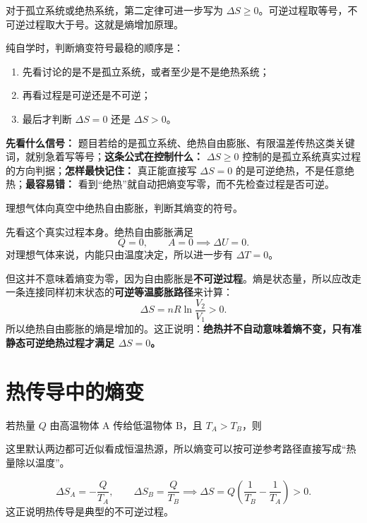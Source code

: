 \documentclass[lang=cn,11pt]{elegantbook}
\begin{document}
对于孤立系统或绝热系统，第二定律可进一步写为 \(\Delta S\ge 0\)。可逆过程取等号，不可逆过程取大于号。这就是熵增加原理。

纯自学时，判断熵变符号最稳的顺序是：
\begin{enumerate}
  \item 先看讨论的是不是孤立系统，或者至少是不是绝热系统；
  \item 再看过程是可逆还是不可逆；
  \item 最后才判断 \(\Delta S=0\) 还是 \(\Delta S>0\)。
\end{enumerate}

\begin{note}
\textbf{先看什么信号：} 题目若给的是孤立系统、绝热自由膨胀、有限温差传热这类关键词，就别急着写等号；\textbf{这条公式在控制什么：} \(\Delta S\ge 0\) 控制的是孤立系统真实过程的方向判据；\textbf{怎样最快记住：} 真正能直接写 \(\Delta S=0\) 的是可逆绝热，不是任意绝热；\textbf{最容易错：} 看到“绝热”就自动把熵变写零，而不先检查过程是否可逆。
\end{note}

\begin{example}[绝热自由膨胀的熵变]
理想气体向真空中绝热自由膨胀，判断其熵变的符号。
\end{example}

\begin{solution}
先看这个真实过程本身。绝热自由膨胀满足
\[
Q=0,\qquad A=0
\implies \Delta U=0.
\]
对理想气体来说，内能只由温度决定，所以进一步有 \(\Delta T=0\)。

但这并不意味着熵变为零，因为自由膨胀是\textbf{不可逆过程}。熵是状态量，所以应改走一条连接同样初末状态的\textbf{可逆等温膨胀路径}来计算：
\[
\Delta S=nR\ln\frac{V_2}{V_1}>0.
\]
所以绝热自由膨胀的熵是增加的。这正说明：\textbf{绝热并不自动意味着熵不变，只有准静态可逆绝热过程才满足 \(\Delta S=0\)。}
\end{solution}

\section{热传导中的熵变}

若热量 \(Q\) 由高温物体 A 传给低温物体 B，且 \(T_A>T_B\)，则

这里默认两边都可近似看成恒温热源，所以熵变可以按可逆参考路径直接写成“热量除以温度”。

\[
\Delta S_A=-\frac{Q}{T_A},\qquad
\Delta S_B=\frac{Q}{T_B}
\implies
\Delta S=Q\left(\frac{1}{T_B}-\frac{1}{T_A}\right)>0.
\]
这正说明热传导是典型的不可逆过程。
\end{document}
